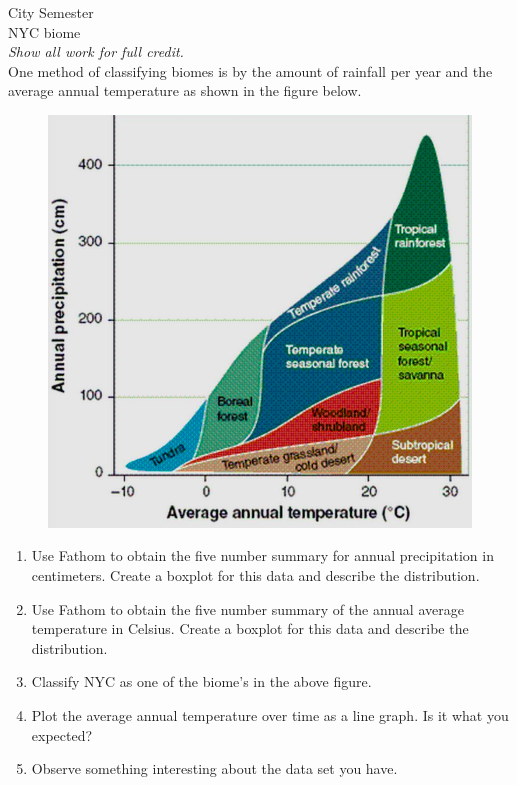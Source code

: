 \documentclass[12pt]{article}
\theoremstyle{plain}     %
\begin{document}
\large
City Semester  %
\\
NYC biome\\
\normalsize 
\emph{Show all work for full credit.}\\
One method of classifying biomes is by the amount of rainfall per year and the average annual temperature as shown in the figure below.
	\begin{figure}[H]
		\includegraphics[scale=.5]{a.png}
	\end{figure}
\begin{enumerate}
	\item Use Fathom to obtain the five number summary for annual precipitation in centimeters. Create a boxplot for this data and describe the distribution.\\
	\item Use Fathom to obtain the five number summary of the annual average temperature in Celsius. Create a boxplot for this data and describe the distribution.\\
	\item Classify NYC as one of the biome's in the above figure.\\
	\item Plot the average annual temperature over time as a line graph. Is it what you expected?\\
	\item Observe something interesting about the data set you have.
\end{enumerate}
	
\end{document}
